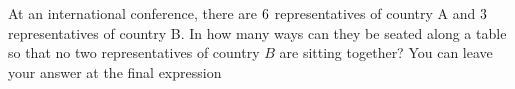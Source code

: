 
%
%
%
%      
% 
% 
%   



\gcalcexpr[0]
\gcalcexpr[0]
\gcalcexpr[0]
\gcalcexpr[0]

\question At an international conference, there are $6$ representatives of country A and $3$ representatives 
of country B. In how many ways can they be seated along a table so that no two representatives of country $B$ 
are sitting together? You can leave your answer at the final expression

